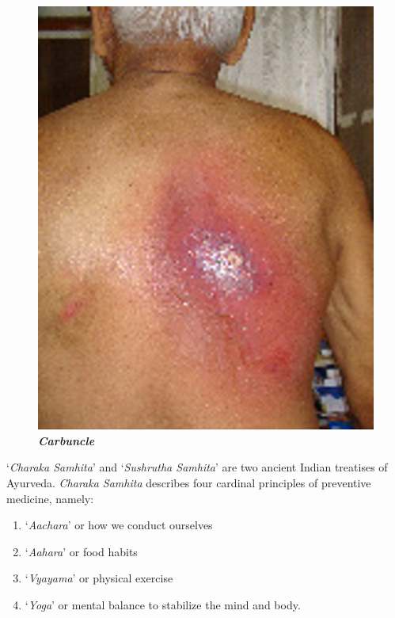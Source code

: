 \begin{figure}
\centering
\includegraphics[scale=.8]{images/006.jpg}\\
\textbf{\textit{Carbuncle}}
\end{figure}

‘\textit{Charaka Samhita}’ and ‘\textit{Sushrutha Samhita}’ are two ancient Indian treatises of Ayurveda. \textit{Charaka Samhita} describes four cardinal princi\-ples of preventive medicine, namely:

\begin{enumerate}
\itemsep=0pt
\item ‘\textit{Aachara}’ or how we conduct ourselves
\item ‘\textit{Aahara}’ or food habits
\item ‘\textit{Vyayama}’ or physical exercise
\item ‘\textit{Yoga}’ or mental balance to stabilize the mind and body.
\end{enumerate}

\clearpage

